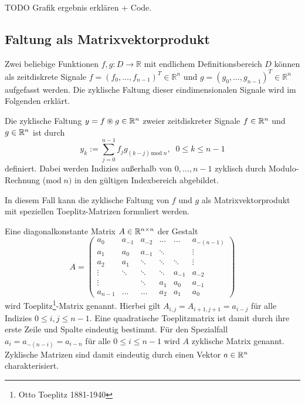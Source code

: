 TODO Grafik ergebnis erklären + Code.

\subsection{Faltung als Matrixvektorprodukt}
\label{abs:conv_using_sparse}
Zwei beliebige Funktionen $f,g: D \rightarrow \mathbb{R}$ mit endlichem Definitionsbereich $D$ können als zeitdiskrete Signale $f=(f_0, \ldots, f_{n-1})^T \in \mathbb{R}^{n}$ und $g=(g_0, \ldots, g_{n-1})^T \in \mathbb{R}^{n}$ aufgefasst werden. %
Die zyklische Faltung dieser eindimensionalen Signale wird im Folgenden erklärt.

\begin{defi}
    \label{def:cycconv}
    Die zyklische Faltung $y=f \circledast g \in \mathbb{R}^{n}$ zweier zeitdiskreter Signale $f \in \mathbb{R}^n$ und $g \in \mathbb{R}^n$ ist durch
    \begin{equation*}
        y_k:=\sum_{j=0}^{n-1} f_j g_{(k-j) \, \mathrm{mod} \; n},  \; \; 0 \leq k \leq n-1
    \end{equation*}
    definiert. Dabei werden Indizies außerhalb von $0, \ldots, n-1$ zyklisch durch Modulo-Rechnung ($\mathrm{mod} \; n)$ in den gültigen Indexbereich abgebildet.
\end{defi}
In diesem Fall kann die zyklische Faltung von $f$ und $g$ als Matrixvektorprodukt mit speziellen Toeplitz-Matrizen formuliert werden. 

\begin{defi}
    \label{def:toeplitzM}
    Eine diagonalkonstante Matrix $A \in \mathbb{R}^{n \times n}$ der Gestalt
    \begin{equation*}
    A=
    \begin{pmatrix}
        a_0 & a_{-1} &a_{-2} &\ldots &\ldots &a_{-(n-1)} \\ 
        a_1 & a_0 &a_{-1} &\ddots & &\vdots \\
        a_2 & a_1 &\ddots &\ddots &\ddots &\vdots\\
        \vdots & \ddots &\ddots &\ddots &a_{-1} &a_{-2}\\
        \vdots & &\ddots &a_1 &a_0 &a_{-1} \\
        a_{n-1} &\ldots &\ldots &a_{2} &a_{1} &a_0
    \end{pmatrix}
\end{equation*}
    wird Toeplitz\footnote{Otto Toeplitz 1881-1940}-Matrix genannt. Hierbei gilt $A_{i,j}=A_{i+1,j+1}=a_{i-j}$ für alle Indizies $0 \leq i, j \leq n-1$. Eine quadratische Toeplitzmatrix ist damit durch ihre erste Zeile und Spalte eindeutig bestimmt. Für den Spezialfall $a_i=a_{-(n-i)}=a_{i-n}$ für alle $0 \leq i \leq n-1$ wird $A$ zyklische Matrix genannt. Zyklische Matrizen sind damit eindeutig durch einen Vektor $a \in \mathbb{R}^n$ charakterisiert.
\end{defi}

